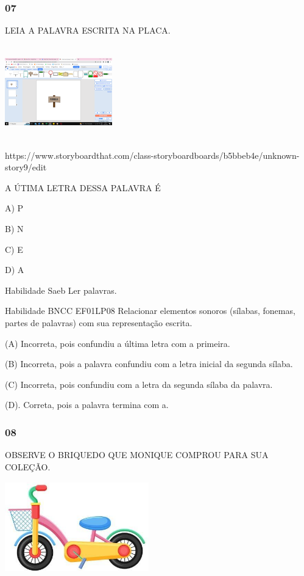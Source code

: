 \begin{escola}
\subsubsection{07}\label{section-47}

LEIA A PALAVRA ESCRITA NA PLACA.

\includegraphics[width=1.83704in,height=1.58560in]{media/image216.png}

https://www.storyboardthat.com/class-storyboardboards/b5bbeb4e/unknown-story9/edit

A ÚTIMA LETRA DESSA PALAVRA É

A) P

B) N

C) E

D) A

Habilidade Saeb Ler palavras.

Habilidade BNCC EF01LP08 Relacionar elementos sonoros (sílabas, fonemas,
partes de palavras) com sua representação escrita.

(A) Incorreta, pois confundiu a última letra com a primeira.

(B) Incorreta, pois a palavra confundiu com a letra inicial da segunda
sílaba.

(C) Incorreta, pois confundiu com a letra da segunda sílaba da palavra.

(D). Correta, pois a palavra termina com a.

\subsubsection{08}\label{section-48}

OBSERVE O BRIQUEDO QUE MONIQUE COMPROU PARA SUA COLEÇÃO.

\includegraphics[width=2.45625in,height=1.54583in]{media/image217.jpg}


\end{escola}
